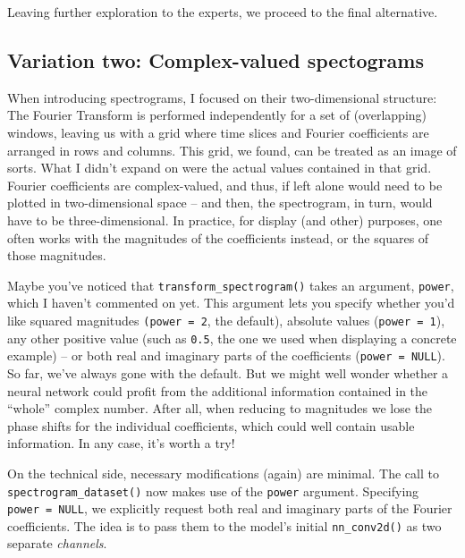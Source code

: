\documentclass[
  letterpaper,
]{krantz}
\begin{document}
Leaving further exploration to the experts, we proceed to the final
alternative.

\hypertarget{variation-two-complex-valued-spectograms}{%
\subsection{\texorpdfstring{Variation two: Complex-valued
spectograms}{Variation two: Complex-valued spectograms}}\label{variation-two-complex-valued-spectograms}}

When introducing spectrograms, I focused on their two-dimensional
structure: The Fourier Transform is performed independently for a set of
(overlapping) windows, leaving us with a grid where time slices and
Fourier coefficients are arranged in rows and columns. This grid, we
found, can be treated as an image of sorts. What I didn't expand on were
the actual values contained in that grid. Fourier coefficients are
complex-valued, and thus, if left alone would need to be plotted in
two-dimensional space -- and then, the spectrogram, in turn, would have
to be three-dimensional. In practice, for display (and other) purposes,
one often works with the magnitudes of the coefficients instead, or the
squares of those magnitudes.

Maybe you've noticed that
\texttt{transform\_spectrogram()}
takes an argument, \texttt{power}, which I haven't commented on yet.
This argument lets you specify whether you'd like squared magnitudes
\texttt{(power\ =\ 2}, the default), absolute values
(\texttt{power\ =\ 1}), any other positive value (such as \texttt{0.5},
the one we used when displaying a concrete example) -- or both real and
imaginary parts of the coefficients (\texttt{power\ =\ NULL}). So far,
we've always gone with the default. But we might well wonder whether a
neural network could profit from the additional information contained in
the ``whole'' complex number. After all, when reducing to magnitudes we
lose the phase shifts for the individual coefficients, which could well
contain usable information. In any case, it's worth a try!

On the technical side, necessary modifications (again) are minimal. The
call to \texttt{spectrogram\_dataset()} now makes use of the
\texttt{power} argument. Specifying \texttt{power\ =\ NULL}, we
explicitly request both real and imaginary parts of the Fourier
coefficients. The idea is to pass them to the model's initial
\texttt{nn\_conv2d()} as two separate \emph{channels}.
\end{document}
